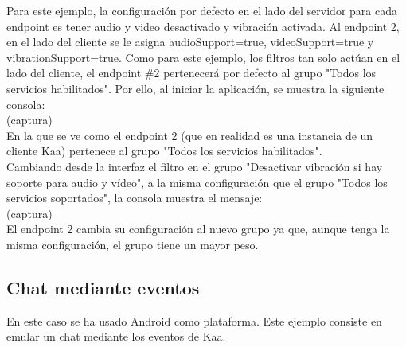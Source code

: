 \documentclass[12pt, twoside]{book}
\begin{document}
Para este ejemplo, la configuración por defecto en el lado del servidor para cada endpoint es tener audio y video desactivado y vibración activada. Al endpoint 2, en el lado del cliente se le asigna audioSupport=true, videoSupport=true y vibrationSupport=true. Como para este ejemplo, los filtros tan solo actúan en el lado del cliente, el endpoint \#2 pertenecerá por defecto al grupo "Todos los servicios habilitados".  Por ello, al iniciar la aplicación, se muestra la siguiente consola: \\
(captura)\\
En la que se ve como el endpoint 2 (que en realidad es una instancia de un cliente Kaa) pertenece al grupo "Todos los servicios habilitados". \\
Cambiando desde la interfaz el filtro en el grupo "Desactivar vibración si hay soporte para audio y vídeo", a la misma configuración que el grupo "Todos los servicios soportados", la consola muestra el mensaje:\\  %
(captura)\\
El endpoint 2 cambia su configuración al nuevo grupo ya que, aunque tenga la misma configuración, el grupo tiene un mayor peso. 
 

\subsection{Chat mediante eventos}
En este caso se ha usado Android como plataforma. Este ejemplo consiste en emular un chat mediante los eventos de Kaa.
\end{document}
